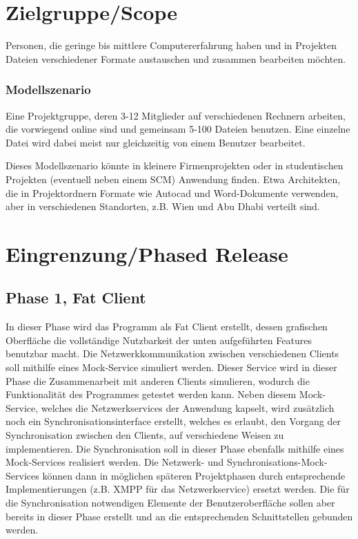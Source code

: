 \section{Zielgruppe/Scope}
Personen, die geringe bis mittlere Computererfahrung haben und in Projekten Dateien verschiedener Formate austauschen und zusammen bearbeiten möchten.

\subsubsection{Modellszenario}
Eine Projektgruppe, deren 3-12 Mitglieder auf verschiedenen Rechnern arbeiten, die vorwiegend online sind und gemeinsam 5-100 Dateien benutzen. Eine einzelne Datei wird dabei meist nur gleichzeitig von einem Benutzer bearbeitet.

Dieses Modellszenario könnte in kleinere Firmenprojekten oder in studentischen Projekten (eventuell neben einem SCM) Anwendung finden. Etwa Architekten, die in Projektordnern Formate wie Autocad und Word-Dokumente verwenden, aber in verschiedenen Standorten, z.B. Wien und Abu Dhabi verteilt sind.

\section{Eingrenzung/Phased Release}

\subsection{Phase 1, Fat Client}
In dieser Phase wird das Programm als Fat Client erstellt, dessen grafischen Oberfläche die vollständige Nutzbarkeit der unten aufgeführten Features benutzbar macht.
Die Netzwerkkommunikation zwischen verschiedenen Clients soll mithilfe eines Mock-Service simuliert werden. Dieser Service wird in dieser Phase die Zusammenarbeit mit anderen Clients simulieren, wodurch die Funktionalität des Programmes getestet werden kann. Neben diesem Mock-Service, welches die Netzwerkservices der Anwendung kapselt, wird zusätzlich noch ein Synchronisationsinterface erstellt, welches es erlaubt, den Vorgang der Synchronisation zwischen den Clients, auf verschiedene Weisen zu implementieren.
Die Synchronisation soll in dieser Phase ebenfalls mithilfe eines Mock-Services  realisiert werden. Die Netzwerk- und Synchronisations-Mock-Services können dann in möglichen späteren Projektphasen durch entsprechende Implementierungen (z.B. XMPP für das Netzwerkservice) ersetzt werden. Die für die Synchronisation notwendigen Elemente der Benutzeroberfläche sollen aber bereits in dieser Phase erstellt und an die entsprechenden Schnittstellen gebunden werden.

